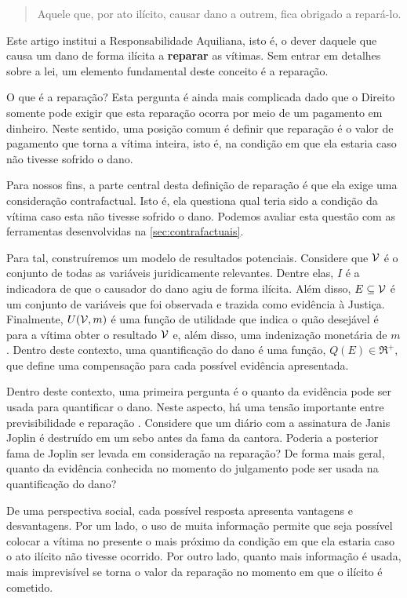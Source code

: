 \begin{quote}
 Aquele que, por ato ilícito, 
 causar dano a outrem, 
 fica obrigado a repará-lo.
\end{quote}

Este artigo institui a Responsabilidade Aquiliana,
isto é, o dever daquele que causa um dano 
de forma ilícita a \textbf{reparar} as vítimas.
Sem entrar em detalhes sobre a lei,
um elemento fundamental deste conceito é a reparação.

O que é a reparação?
Esta pergunta é ainda mais complicada dado que
o Direito somente pode exigir que
esta reparação ocorra por meio de 
um pagamento em dinheiro.
Neste sentido, uma posição comum é
definir que reparação é 
o valor de pagamento que 
torna a vítima inteira, isto é,
na condição em que ela estaria caso
não tivesse sofrido o dano.

Para nossos fins,
a parte central desta definição de reparação é que
ela exige uma consideração contrafactual. Isto é,
ela questiona qual teria sido a condição da vítima
caso esta não tivesse sofrido o dano.
Podemos avaliar esta questão com
as ferramentas desenvolvidas 
na \cref{sec:contrafactuais}.

Para tal, construíremos 
um modelo de resultados potenciais.
Considere que ${\mathcal V}$ é
o conjunto de todas as variáveis juridicamente relevantes.
Dentre elas, $I$ é a indicadora de que
o causador do dano agiu de forma ilícita.
Além disso, $E \subseteq {\mathcal V}$ é 
um conjunto de variáveis que foi observada e
trazida como evidência à Justiça.
Finalmente, $U({\mathcal V}, m)$ é 
uma função de utilidade que
indica o quão desejável é para a vítima
obter o resultado ${\mathcal V}$ e, além disso,
uma indenização monetária de $m$.
Dentro deste contexto, 
uma quantificação do dano é
uma função, $Q(E) \in \Re^{+}$, que 
define uma compensação para 
cada possível evidência apresentada.

Dentro deste contexto,
uma primeira pergunta é
o quanto da evidência pode ser usada
para quantificar o dano.
Neste aspecto, há uma tensão importante entre
previsibilidade e reparação \citep{Fisher1990}.
Considere que um diário com a assinatura de Janis Joplin é
destruído em um sebo antes da fama da cantora.
Poderia a posterior fama de Joplin 
ser levada em consideração na reparação?
De forma mais geral, quanto da evidência conhecida
no momento do julgamento pode ser usada
na quantificação do dano?

De uma perspectiva social, 
cada possível resposta apresenta
vantagens e desvantagens.
Por um lado, o uso de muita informação permite que
seja possível colocar a vítima no presente
o mais próximo da condição em que ela estaria
caso o ato ilícito não tivesse ocorrido.
Por outro lado, quanto mais informação é usada,
mais imprevisível se torna o valor da reparação
no momento em que o ilícito é cometido.

